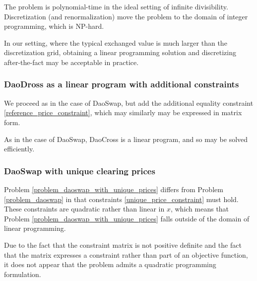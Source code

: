 \documentclass[11pt, reqno]{amsart}
\theoremstyle{definition}
\theoremstyle{remark}
\begin{document}
The problem is polynomial-time in the ideal setting of infinite divisibility.
Discretization (and renormalization) move the problem to the domain of
integer programming, which is NP-hard.

In our setting, where the typical exchanged value is much larger than the
discretization grid, obtaining a linear programming solution and
discretizing after-the-fact may be acceptable in practice.

\subsubsection{DaoDross as a linear program with additional constraints}

We proceed as in the case of DaoSwap, but add the additional equality
constraint \eqref{reference_price_constraint}, which may similarly
may be expressed in matrix form.

As in the case of DaoSwap, DaoCross is a linear program, and so may be solved
efficiently.

\subsubsection{DaoSwap with unique clearing prices}

Problem \ref{problem_daoswap_with_unique_prices} differs from
Problem \ref{problem_daoswap} in that constraints
\eqref{unique_price_constraint} must hold. These constraints are quadratic
rather than linear in $x$, which means that Problem
\ref{problem_daoswap_with_unique_prices} falls outside of the domain of
linear programming.

Due to the fact that the constraint matrix is not positive definite and
the fact that the matrix expresses a constraint rather than part of an
objective function, it does not appear that the problem admits a
quadratic programming formulation.
\end{document}
